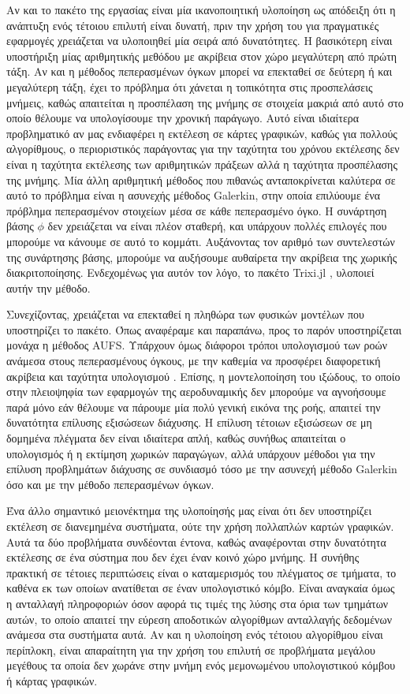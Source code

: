 Αν και το πακέτο της εργασίας είναι μία ικανοποιητική υλοποίηση ως απόδειξη ότι η ανάπτυξη ενός τέτοιου επιλυτή είναι δυνατή, πριν την χρήση του για πραγματικές εφαρμογές χρειάζεται να υλοποιηθεί μία σειρά από δυνατότητες.
Η βασικότερη είναι υποστήριξη μίας αριθμητικής μεθόδου με ακρίβεια στον χώρο μεγαλύτερη από πρώτη τάξη.
Αν και η μέθοδος πεπερασμένων όγκων μπορεί να επεκταθεί σε δεύτερη ή και μεγαλύτερη τάξη, έχει το πρόβλημα ότι χάνεται η τοπικότητα στις προσπελάσεις μνήμεις, καθώς απαιτείται η προσπέλαση της μνήμης σε στοιχεία μακριά από αυτό στο οποίο θέλουμε να υπολογίσουμε την χρονική παράγωγο.
Αυτό είναι ιδιαίτερα προβληματικό αν μας ενδιαφέρει η εκτέλεση σε κάρτες γραφικών, καθώς για πολλούς αλγορίθμους, ο περιοριστικός παράγοντας για την ταχύτητα του χρόνου εκτέλεσης δεν είναι η ταχύτητα εκτέλεσης των αριθμητικών πράξεων αλλά η ταχύτητα προσπέλασης της μνήμης.
Μία άλλη αριθμητική μέθοδος που πιθανώς ανταποκρίνεται καλύτερα σε αυτό το πρόβλημα είναι η ασυνεχής μέθοδος Galerkin, στην οποία επιλύουμε ένα πρόβλημα πεπερασμένον στοιχείων μέσα σε κάθε πεπερασμένο όγκο.
Η συνάρτηση βάσης $\phi$ δεν χρειάζεται να είναι πλέον σταθερή, και υπάρχουν πολλές επιλογές που μπορούμε να κάνουμε σε αυτό το κομμάτι.
Αυξάνοντας τον αριθμό των συντελεστών της συνάρτησης βάσης, μπορούμε να αυξήσουμε αυθαίρετα την ακρίβεια της χωρικής διακριτοποίησης.
Ενδεχομένως για αυτόν τον λόγο, το πακέτο Trixi.jl \cite{Trixi2020}, υλοποιεί αυτήν την μέθοδο.

Συνεχίζοντας, χρειάζεται να επεκταθεί η πληθώρα των φυσικών μοντέλων που υποστηρίζει το πακέτο.
Όπως αναφέραμε και παραπάνω, προς το παρόν υποστηρίζεται μονάχα η μέθοδος AUFS.
Υπάρχουν όμως διάφοροι τρόποι υπολογισμού των ροών ανάμεσα στους πεπερασμένους όγκους, με την καθεμία να προσφέρει διαφορετική ακρίβεια και ταχύτητα υπολογισμού \cite{Toro2012}.
Επίσης, η μοντελοποίηση του ιξώδους, το οποίο στην πλειοψηφία των εφαρμογών της αεροδυναμικής δεν μπορούμε να αγνοήσουμε παρά μόνο εάν θέλουμε να πάρουμε μία πολύ γενική εικόνα της ροής, απαιτεί την δυνατότητα επίλυσης εξισώσεων διάχυσης.
Η επίλυση τέτοιων εξισώσεων σε μη δομημένα πλέγματα δεν είναι ιδιαίτερα απλή, καθώς συνήθως απαιτείται ο υπολογισμός ή η εκτίμηση χωρικών παραγώγων, αλλά υπάρχουν μέθοδοι για την επίλυση προβλημάτων διάχυσης σε συνδιασμό τόσο με την ασυνεχή μέθοδο Galerkin όσο και με την μέθοδο πεπερασμένων όγκων.

Ένα άλλο σημαντικό μειονέκτημα της υλοποίησής μας είναι ότι δεν υποστηρίζει εκτέλεση σε διανεμημένα συστήματα, ούτε την χρήση πολλαπλών καρτών γραφικών.
Αυτά τα δύο προβλήματα συνδέονται έντονα, καθώς αναφέρονται στην δυνατότητα εκτέλεσης σε ένα σύστημα που δεν έχει έναν κοινό χώρο μνήμης.
Η συνήθης πρακτική σε τέτοιες περιπτώσεις είναι ο καταμερισμός του πλέγματος σε τμήματα, το καθένα εκ των οποίων ανατίθεται σε έναν υπολογιστικό κόμβο.
Είναι αναγκαία όμως η ανταλλαγή πληροφοριών όσον αφορά τις τιμές της λύσης στα όρια των τμημάτων αυτών, το οποίο απαιτεί την εύρεση αποδοτικών αλγορίθμων ανταλλαγής δεδομένων ανάμεσα στα συστήματα αυτά.
Αν και η υλοποίηση ενός τέτοιου αλγορίθμου είναι περίπλοκη, είναι απαραίτητη για την χρήση του επιλυτή σε προβλήματα μεγάλου μεγέθους τα οποία δεν χωράνε στην μνήμη ενός μεμονωμένου υπολογιστικού κόμβου ή κάρτας γραφικών.


